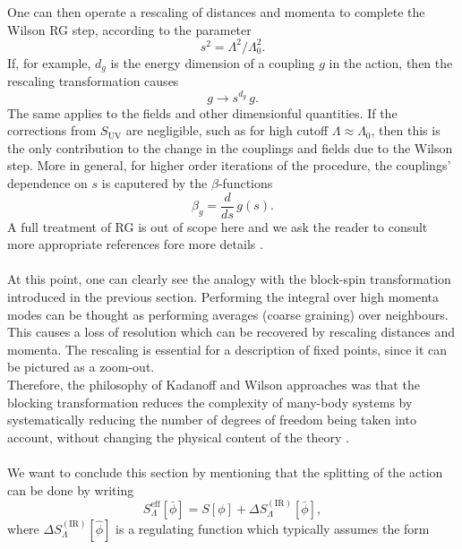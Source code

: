 One can then operate a rescaling of distances and momenta to complete the Wilson RG step, according to the parameter 
\begin{equation*}
    s^2 = \Lambda^2 / \Lambda_0^2.
\end{equation*}
If, for example, $d_g$ is the energy dimension of a coupling $g$ in the action, then the rescaling transformation causes 
\begin{equation*} 
    g \to s^{d_g} \, g.
\end{equation*}
The same applies to the fields and other dimensionful quantities. If the corrections from $S_\text{UV}$ are negligible, such as for high cutoff $\Lambda \approx \Lambda_0$, then this is the only contribution to the change in the couplings and fields due to the Wilson step. More in general, for higher order iterations of the procedure, the couplings' dependence on $s$ is caputered by the $\beta$-functions 
\begin{equation*}
    \beta_g = \frac{d}{ds} \, g(s).
\end{equation*}
A full treatment of RG is out of scope here and we ask the reader to consult more appropriate references fore more details \cite{Peskin:1995ev}. \\~\\
At this point, one can clearly see the analogy with the block-spin transformation introduced in the previous section. Performing the integral over high momenta modes
can be thought as performing averages (coarse graining) over neighbours. This causes a loss of resolution which can be recovered by rescaling distances and momenta. The rescaling is essential for a description of fixed points, since it can be pictured as a zoom-out. \\
Therefore, the philosophy of Kadanoff and Wilson approaches was that the blocking transformation reduces the complexity of many-body systems by systematically reducing the number of degrees of freedom being taken into account, without changing the physical content of the
theory \cite{WILSON197475,carosso2020novel}. \\~\\
We want to conclude this section by mentioning that the splitting of the action can be done by writing
\begin{equation*}
    S^\text{eff}_\Lambda[\bar\phi] = S[\phi] + \Delta S_{\Lambda}^{(\mathrm{IR})}[\bar\phi],
\end{equation*}
where $\Delta S_{\Lambda}^{(\mathrm{IR})}[\hat{\phi}]$ is a regulating function which typically assumes the form
